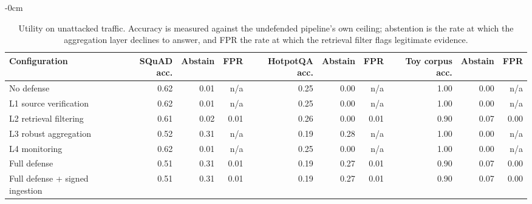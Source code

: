 \begin{table}[H]
\begin{adjustwidth}{-\extralength}{0cm}
\footnotesize
\caption{Utility on unattacked traffic. Accuracy is measured against the undefended pipeline's own ceiling; abstention is the rate at which the aggregation layer declines to answer, and FPR the rate at which the retrieval filter flags legitimate evidence.\label{tab:utility}}
\begin{tabular}{lrrrrrrrrr}
\toprule
\textbf{Configuration} & \textbf{SQuAD acc.} & \textbf{Abstain} & \textbf{FPR} & \textbf{HotpotQA acc.} & \textbf{Abstain} & \textbf{FPR} & \textbf{Toy corpus acc.} & \textbf{Abstain} & \textbf{FPR}\\
\midrule
No defense & 0.62 & 0.01 & n/a & 0.25 & 0.00 & n/a & 1.00 & 0.00 & n/a\\
L1 source verification & 0.62 & 0.01 & n/a & 0.25 & 0.00 & n/a & 1.00 & 0.00 & n/a\\
L2 retrieval filtering & 0.61 & 0.02 & 0.01 & 0.26 & 0.00 & 0.01 & 0.90 & 0.07 & 0.00\\
L3 robust aggregation & 0.52 & 0.31 & n/a & 0.19 & 0.28 & n/a & 1.00 & 0.00 & n/a\\
L4 monitoring & 0.62 & 0.01 & n/a & 0.25 & 0.00 & n/a & 1.00 & 0.00 & n/a\\
Full defense & 0.51 & 0.31 & 0.01 & 0.19 & 0.27 & 0.01 & 0.90 & 0.07 & 0.00\\
Full defense + signed ingestion & 0.51 & 0.31 & 0.01 & 0.19 & 0.27 & 0.01 & 0.90 & 0.07 & 0.00\\
\bottomrule
\end{tabular}
\end{adjustwidth}
\end{table}
